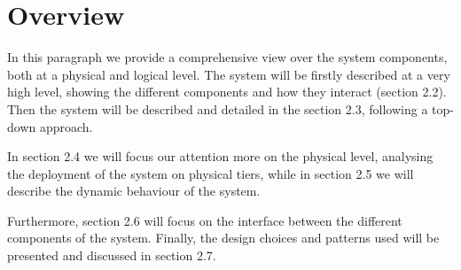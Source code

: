 \section{Overview}
In this paragraph we provide a comprehensive view over the system components, both at a physical and logical level.
The system will be firstly described at a very high level, showing the different components and how they interact (section 2.2).
Then the system will be described and detailed in the section 2.3, following a top-down approach.

In section 2.4 we will focus our attention more on the physical level, analysing the deployment of the system on physical tiers, while in section 2.5 we will describe the dynamic behaviour of the system.

Furthermore, section 2.6 will focus on the interface between the different components of the system.
Finally, the design choices and patterns used will be presented and discussed in section 2.7.
